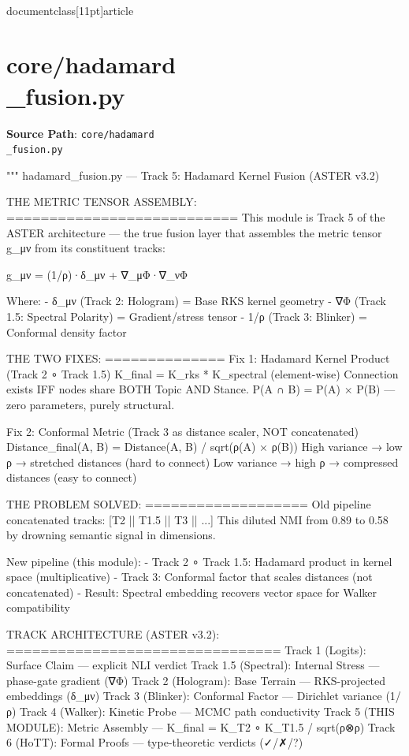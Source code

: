 \\documentclass[11pt]{article}
\begin{document}
\section*{core/hadamard\\_fusion.py}
\textbf{Source Path}: \texttt{core/hadamard\\_fusion.py}\par
\bigskip
\begin{CodeBlock}
"""
hadamard_fusion.py — Track 5: Hadamard Kernel Fusion (ASTER v3.2)

THE METRIC TENSOR ASSEMBLY:
===========================
This module is Track 5 of the ASTER architecture — the true fusion layer that
assembles the metric tensor g_μν from its constituent tracks:

    g_μν = (1/ρ)·δ_μν + ∇_μΦ·∇_νΦ

Where:
    - δ_μν (Track 2: Hologram) = Base RKS kernel geometry
    - ∇Φ (Track 1.5: Spectral Polarity) = Gradient/stress tensor
    - 1/ρ (Track 3: Blinker) = Conformal density factor

THE TWO FIXES:
==============
Fix 1: Hadamard Kernel Product (Track 2 ∘ Track 1.5)
    K_final = K_rks * K_spectral  (element-wise)
    Connection exists IFF nodes share BOTH Topic AND Stance.
    P(A ∩ B) = P(A) × P(B) — zero parameters, purely structural.

Fix 2: Conformal Metric (Track 3 as distance scaler, NOT concatenated)
    Distance_final(A, B) = Distance(A, B) / sqrt(ρ(A) × ρ(B))
    High variance → low ρ → stretched distances (hard to connect)
    Low variance → high ρ → compressed distances (easy to connect)

THE PROBLEM SOLVED:
===================
Old pipeline concatenated tracks: [T2 || T1.5 || T3 || ...]
This diluted NMI from 0.89 to 0.58 by drowning semantic signal in dimensions.

New pipeline (this module):
    - Track 2 ∘ Track 1.5: Hadamard product in kernel space (multiplicative)
    - Track 3: Conformal factor that scales distances (not concatenated)
    - Result: Spectral embedding recovers vector space for Walker compatibility

TRACK ARCHITECTURE (ASTER v3.2):
================================
Track 1 (Logits):       Surface Claim — explicit NLI verdict
Track 1.5 (Spectral):   Internal Stress — phase-gate gradient (∇Φ)
Track 2 (Hologram):     Base Terrain — RKS-projected embeddings (δ_μν)
Track 3 (Blinker):      Conformal Factor — Dirichlet variance (1/ρ)
Track 4 (Walker):       Kinetic Probe — MCMC path conductivity
Track 5 (THIS MODULE):  Metric Assembly — K_final = K_T2 ∘ K_T1.5 / sqrt(ρ⊗ρ)
Track 6 (HoTT):         Formal Proofs — type-theoretic verdicts (✓/✗/?)


\end{CodeBlock}
\end{document}
